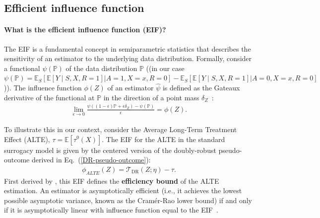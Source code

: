\documentclass{article}
\theoremstyle{plain}
\theoremstyle{definition}
\theoremstyle{remark}
\newcommand{\1}{\mathds{1}}                %
\begin{document}
\subsection{Efficient influence function}
\label{app:eif}

\paragraph{What is the efficient influence function (EIF)? } The EIF is a fundamental concept in semiparametric statistics that describes the sensitivity of an estimator to the underlying data distribution. Formally, consider a functional $\psi(\mathbb{P})$ of the data distribution $\mathbb{P}$ ((in our case $\psi(\mathbb{P})=\mathbb{E}_{S}[\mathbb{E}[Y \mid S, X, R=1]| A=1, X=x, R=0]- \mathbb{E}_{S}[\mathbb{E}[Y \mid S, X, R=1]| A=0, X=x, R=0]$)). The influence function $\phi(Z)$ of an estimator $\hat{\psi}$  is defined as the Gateaux derivative of the functional at $\mathbb{P}$ in the direction of a point mass $\delta_Z$~\cite{Hampel.1974}:
\begin{align}
    \lim_{\epsilon \to 0} \frac{\psi((1-\epsilon)\mathbb{P} + \epsilon \delta_Z) - \psi(\mathbb{P})}{\epsilon} = \phi(Z).
\end{align}

To illustrate this in our context, consider the Average Long-Term Treatment Effect (ALTE), $\tau = \mathbb{E}[\tau^0(X)]$. The EIF for the ALTE in the standard surrogacy model is given by the centered version of the doubly-robust pseudo-outcome derived in Eq.~(\ref{DR-pseudo-outcome}):
\begin{align}
    \phi_{ALTE}(Z) = \mathcal{T}_\mathrm{DR}(Z;\eta) - \tau.
\end{align}
First derived by \citet{Chen.2023, Athey.2025}, this EIF defines the \textbf{efficiency bound} of the ALTE estimation. An estimator is asymptotically efficient (i.e., it achieves the lowest possible asymptotic variance, known as the Cram\'er-Rao lower bound) if and only if it is asymptotically linear with influence function equal to the EIF~\cite{Bickel.1993, Tsiatis.2006}.
\end{document}

